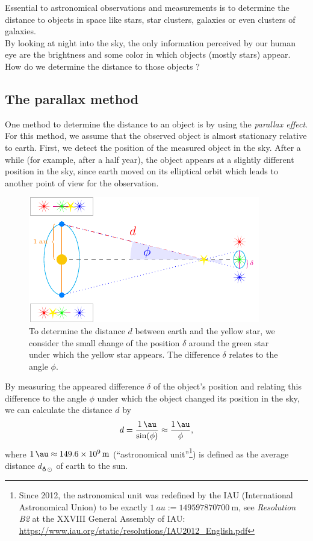 Essential to astronomical observations and measurements is to determine the distance to objects in space like stars, star clusters, galaxies or even clusters of galaxies. \\
By looking at night into the sky, the only information perceived by our human eye are the brightness and some color in which objects (mostly stars) appear.
How do we determine the distance to those objects ?


\subsection{The parallax method}

One method to determine the distance to an object is by using the \textit{parallax effect}. \\
For this method, we assume that the observed object is almost stationary relative to earth.
First, we detect the position of the measured object in the sky. After a while (for example, after a half year), the object appears at a slightly different position in the sky, since earth moved on its elliptical orbit which leads to another point of view for the observation.
\begin{figure}[H]
    \centering
    \includegraphics[scale=1.8]{figures/tikz/parallax/parallax.pdf}
    \caption{To determine the distance $d$ between earth and the yellow star, we consider the small change of the position $\delta$ around the green star under which the yellow star appears. The difference $\delta$ relates to the angle $\phi$.}
\end{figure}
\noindent By measuring the appeared difference $\delta$ of the object's position and relating this difference to the angle $\phi$ under which the object changed its position in the sky, we can calculate the distance $d$ by 
\begin{align}
    d = \frac{\SI{1}{\au}}{\sin(\phi)} \approx \frac{\SI{1}{\au}}{\phi},
\end{align}
where $\SI{1}{\au} \approx \SI{149.6e+9}{\meter}$ (``astronomical unit''\footnote{Since 2012, the astronomical unit was redefined by the IAU (International Astronomical Union) to be exactly $\SI{1}{au} := \SI{149597870700}{\meter}$, see \textit{Resolution B2} at the XXVIII General Assembly of IAU: \href{https://www.iau.org/static/resolutions/IAU2012\_English.pdf}{https://www.iau.org/static/resolutions/IAU2012\_English.pdf}}) is defined as the average distance $d_{\earth \odot}$ of earth to the sun. \\ 
